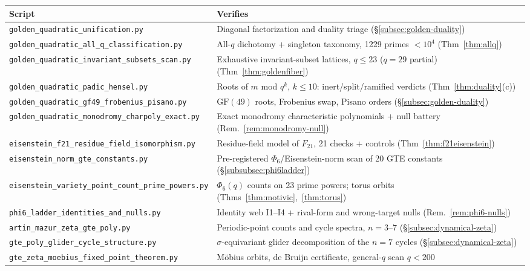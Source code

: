 \documentclass[11pt]{article}
\theoremstyle{remark}
\newcommand{\GF}[1]{\ensuremath{\mathrm{GF}(#1)}}
\begin{document}
\begin{appendices}
\begin{center}
\scriptsize
\begin{tabular}{@{}p{7.2cm}p{5.8cm}@{}}
\toprule
Script & Verifies \\
\midrule
\texttt{golden\_quadratic\_unification.py}
  & Diagonal factorization and duality triage (§\ref{subsec:golden-duality}) \\
\texttt{golden\_quadratic\_all\_q\_classification.py}
  & All-$q$ dichotomy + singleton taxonomy, 1229 primes $< 10^4$
    (Thm~\ref{thm:allq}) \\
\texttt{golden\_quadratic\_invariant\_subsets\_scan.py}
  & Exhaustive invariant-subset lattices, $q \leq 23$ ($q = 29$ partial)
    (Thm~\ref{thm:goldenfiber}) \\
\texttt{golden\_quadratic\_padic\_hensel.py}
  & Roots of $m$ mod $q^k$, $k \leq 10$: inert/split/ramified verdicts
    (Thm~\ref{thm:duality}(c)) \\
\texttt{golden\_quadratic\_gf49\_frobenius\_pisano.py}
  & $\GF{49}$ roots, Frobenius swap, Pisano orders
    (§\ref{subsec:golden-duality}) \\
\texttt{golden\_quadratic\_monodromy\_charpoly\_exact.py}
  & Exact monodromy characteristic polynomials + null battery
    (Rem.~\ref{rem:monodromy-null}) \\
\texttt{eisenstein\_f21\_residue\_field\_isomorphism.py}
  & Residue-field model of $F_{21}$, 21 checks + controls
    (Thm~\ref{thm:f21eisenstein}) \\
\texttt{eisenstein\_norm\_gte\_constants.py}
  & Pre-registered $\Phi_6$/Eisenstein-norm scan of 20 GTE constants
    (§\ref{subsubsec:phi6ladder}) \\
\texttt{eisenstein\_variety\_point\_count\_prime\_powers.py}
  & $\Phi_6(q)$ counts on 23 prime powers; torus orbits
    (Thms~\ref{thm:motivic},~\ref{thm:torus}) \\
\texttt{phi6\_ladder\_identities\_and\_nulls.py}
  & Identity web I1--I4 + rival-form and wrong-target nulls
    (Rem.~\ref{rem:phi6-nulls}) \\
\texttt{artin\_mazur\_zeta\_gte\_poly.py}
  & Periodic-point counts and cycle spectra, $n = 3$--$7$
    (§\ref{subsec:dynamical-zeta}) \\
\texttt{gte\_poly\_glider\_cycle\_structure.py}
  & $\sigma$-equivariant glider decomposition of the $n = 7$ cycles
    (§\ref{subsec:dynamical-zeta}) \\
\texttt{gte\_zeta\_moebius\_fixed\_point\_theorem.py}
  & M\"obius orbits, de Bruijn certificate, general-$q$ scan $q < 200$

\end{tabular}
\end{center}
\end{appendices}
\end{document}

